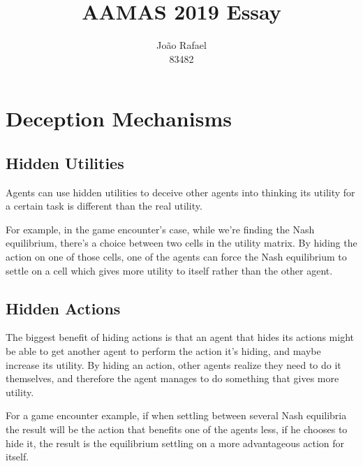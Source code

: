 \documentclass{aamas2017}
\begin{document}
\title{AAMAS 2019 Essay}

\author{
    \alignauthor
    João Rafael\\83482
}

\maketitle
\section{Deception Mechanisms}
    \subsection{Hidden Utilities}
        \par
        Agents can use hidden utilities to deceive other agents into thinking its utility for a certain task is different than the real utility.
        \par
        For example, in the game encounter's case, while we're finding the Nash equilibrium, there's a choice between two cells in the utility matrix. By hiding the action on one of those cells, one of the agents can force the Nash equilibrium to settle on a cell which gives more utility to itself rather than the other agent.

    \subsection{Hidden Actions}
        \par
        The biggest benefit of hiding actions is that an agent that hides its actions might be able to get another agent to perform the action it's hiding, and maybe increase its utility. By hiding an action, other agents realize they need to do it themselves, and therefore the agent manages to do something that gives more utility.
        \par
        For a game encounter example, if when settling between several Nash equilibria the result will be the action that benefits one of the agents less, if he chooses to hide it, the result is the equilibrium settling on a more advantageous action for itself.
\end{document}
